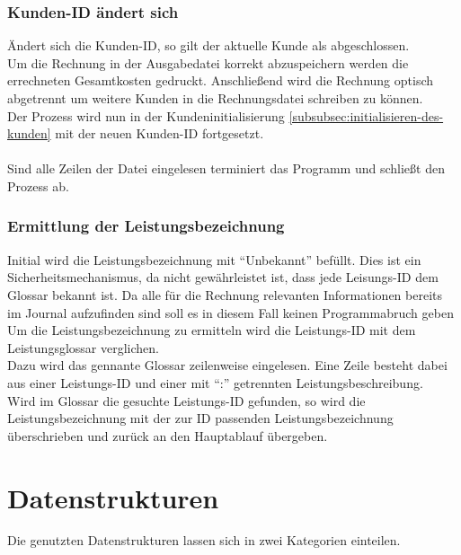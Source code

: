 \subsubsection{Kunden-ID ändert sich}\label{subsubsec:kunden-id-aendert-sich}
Ändert sich die Kunden-ID, so gilt der aktuelle Kunde als abgeschlossen.\\
Um die Rechnung in der Ausgabedatei korrekt abzuspeichern werden die errechneten Gesamtkosten gedruckt. Anschließend wird die Rechnung optisch abgetrennt um weitere Kunden in die Rechnungsdatei schreiben zu können.\\
Der Prozess wird nun in der Kundeninitialisierung \ref{subsubsec:initialisieren-des-kunden} mit der neuen Kunden-ID fortgesetzt.\\
\\

Sind alle Zeilen der Datei eingelesen terminiert das Programm und schließt den Prozess ab.\\

\subsubsection{Ermittlung der Leistungsbezeichnung}\label{subsubsec:ermittlung-der-leistungsbezeichnung}
Initial wird die Leistungsbezeichnung mit \enquote{Unbekannt} befüllt. Dies ist ein Sicherheitsmechanismus, da nicht gewährleistet ist, dass jede Leisungs-ID dem Glossar bekannt ist. Da alle für die Rechnung relevanten Informationen bereits im Journal aufzufinden sind soll es in diesem Fall keinen Programmabruch geben\\
Um die Leistungsbezeichnung zu ermitteln wird die Leistungs-ID mit dem Leistungsglossar verglichen.\\
Dazu wird das gennante Glossar zeilenweise eingelesen. Eine Zeile besteht dabei aus einer Leistungs-ID und einer mit \enquote{:} getrennten Leistungsbeschreibung.\\
Wird im Glossar die gesuchte Leistungs-ID gefunden, so wird die Leistungsbezeichnung mit der zur ID passenden Leistungsbezeichnung überschrieben und zurück an den Hauptablauf übergeben.\\

\section{Datenstrukturen}\label{subsec:datenstrukt}
Die genutzten Datenstrukturen lassen sich in zwei Kategorien einteilen.\\

